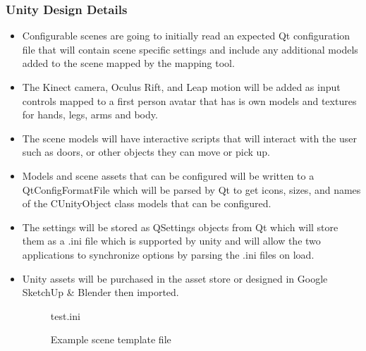 \documentclass[a4paper,10pt]{article}
\begin{document}
		\subsubsection{Unity Design Details}	
\begin{itemize}
	\item Configurable scenes are going to initially read an expected Qt configuration file that 
	will contain scene specific settings and include any additional models added to the scene mapped 
	by the mapping tool. 
	\item The Kinect camera, Oculus Rift, and Leap motion will be added as input controls mapped to a first person avatar that has is own models and textures for hands, legs, arms and body. 
	\item The scene models will have interactive scripts that will interact with the user such as doors, or other objects they can move or pick up. 
	\item Models and scene assets that can be configured will be written to a QtConfigFormatFile which will be parsed by Qt to get icons, sizes, and names of the CUnityObject class models that can be configured. 
	\item The settings will be stored as QSettings objects from Qt which will store them as a .ini file which is supported by unity and will allow the two applications to synchronize options by parsing the .ini files on load. 
	\item Unity assets will be purchased in the asset store or designed in Google SketchUp \& Blender then imported. 
\begin{figure}[H]
	\label{fig:sceneTemplate}
 {test.ini}
\caption{Example scene template file}
\end{figure}
\end{itemize}	
		\pagebreak
\end{document}
